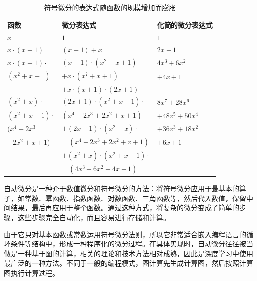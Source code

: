 \begin{table}[htp]
\centering
\caption{符号微分的表达式随函数的规模增加而膨胀}
\label{tab:9-4}
\small
\begin{tabular}{l | l l}
\rule{0pt}{18pt}     函数 & 微分表达式 & 化简的微分表达式  \\
\hline
\rule{0pt}{18pt}     $x$ & $1$ & $1$ \\
\rule{0pt}{18pt}     $x\cdot(x+1)$ & $(x+1)+x$ & $2x + 1$ \\
\rule{0pt}{18pt}     $x\cdot(x+1)\cdot$ & $(x+1)\cdot(x^2+x+1)$ & $4x^3+6x^2$ \\
$(x^2+x+1)$ & $+x\cdot(x^2+x+1)$ & $+4x+1$ \\
                     & $+x\cdot(x+1)\cdot(2x+1)$ & \\
\rule{0pt}{18pt}     $(x^2+x)\cdot$ & $(2x+1)\cdot(x^2+x+1)\cdot$ & $8x^7+28x^6$ \\
$(x^2+x+1)\cdot$ & $(x^4+2x^3+2x^2+x+1)$ & $+48x^5+50x^4$ \\
$(x^4+2x^3$ & $+(2x+1)\cdot(x^2+x)\cdot$ & $+36x^3+18x^2$ \\
$+2x^2+x+1)$ & \ \ $(x^4+2x^3+2x^2+x+1)$ & $+6x+1$ \\
 & $+(x^2+x)\cdot(x^2+x+1)\cdot$ & \\
 & \ \ $(4x^3+6x^2+4x+1)$ & \\
\end{tabular}
\end{table}

%

\vspace{0.5em}
\vspace{0.5em}

\parinterval  自动微分是一种介于数值微分和符号微分的方法：将符号微分应用于最基本的算子，如常数、幂函数、指数函数、对数函数、三角函数等，然后代入数值，保留中间结果，最后再应用于整个函数。通过这种方式，将复杂的微分变成了简单的步骤，这些步骤完全自动化，而且容易进行存储和计算。

\parinterval  由于它只对基本函数或常数运用符号微分法则，所以它非常适合嵌入编程语言的循环条件等结构中，形成一种程序化的微分过程。在具体实现时，自动微分往往被当做是一种基于图的计算，相关的理论和技术方法相对成熟，因此是深度学习中使用最广泛的一种方法。不同于一般的编程模式，图计算先生成计算图，然后按照计算图执行计算过程。

